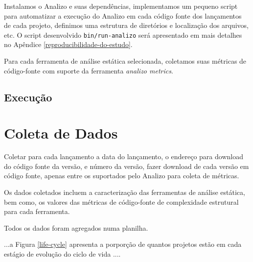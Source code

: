 
Instalamos o Analizo e suas dependências, implementamos um pequeno script para
automatizar a execução do Analizo em cada código fonte dos lançamentos de cada
projeto, definimos uma estrutura de diretórios e localização dos arquivos, etc.
O script desenvolvido \texttt{bin/run-analizo} será apresentado em mais
detalhes no Apêndice \ref{reproducibilidade-do-estudo}.


Para cada ferramenta de análise estática selecionada, coletamos  suas métricas de código-fonte
com suporte da ferramenta {\it analizo metrics}. 

\subsection{Execução}

\section{Coleta de Dados} \label{estudo3:coleta}

Coletar para cada lançamento a data do lançamento, o endereço para download
do código fonte da versão, e número da versão, fazer download de cada versão
em código fonte, apenas entre os suportados pelo Analizo para coleta de métricas.

Os dados coletados incluem a caracterização das ferramentas de análise
estática, bem como, os valores das métricas de código-fonte de complexidade
estrutural para cada ferramenta.

Todos os dados foram agregados numa planilha.

...a Figura \ref{life-cycle} apresenta a porporção de quantos projetos estão em
cada estágio de evolução do ciclo de vida ....

